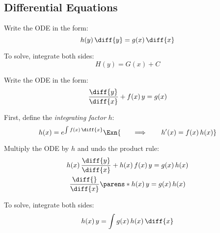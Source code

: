 \subsection{Differential Equations}%
\label{sub:diff-eq}

\begin{multicols}{2}

    \begin{CheatsheetEntryFrame}


        Write the ODE in the form:
        \begin{equation*}
            h(y) \,\diff{y} = g(x) \,\diff{x}
        \end{equation*}

        To solve, integrate both sides:
        \begin{equation*}
            H(y) = G(x) + C
        \end{equation*}

    \end{CheatsheetEntryFrame}

    \begin{CheatsheetEntryFrame}


        Write the ODE in the form:
        \begin{equation*}
            \frac{\diff{y}}{\diff{x}} + f(x) \, y = g(x)
        \end{equation*}

        First, define the \textit{integrating factor} $h$:
        \begin{equation*}
            h(x) = e^{\int{f(x) \,\diff{x}}}
            \Exn{
                \qquad \Longrightarrow \qquad
                h'(x) = f(x) \, h(x)
            }
        \end{equation*}

        Multiply the ODE by $h$ and undo the product rule:
        \begin{gather*}
            h(x) \, \frac{\diff{y}}{\diff{x}} + h(x) \, f(x) \, y = g(x) \, h(x) \\
            \frac{\diff{}}{\diff{x}} \parens*{h(x) \, y} = g(x) \, h(x)
        \end{gather*}

        To solve, integrate both sides:
        \begin{equation*}
            h(x) \, y = \int{g(x) \, h(x) \,\diff{x}}
        \end{equation*}


\end{CheatsheetEntryFrame}
\end{multicols}
